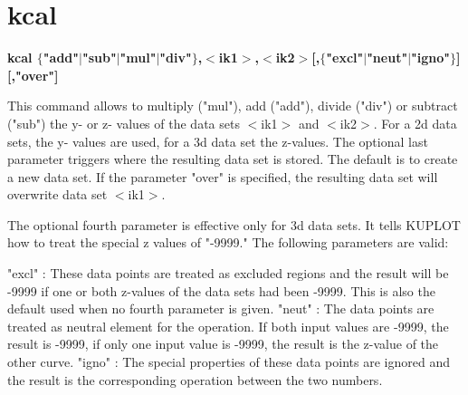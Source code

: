 \section{kcal}
{\bf kcal $ \{$"add"$| $"sub"$| $"mul"$| $"div"$\} $,$ <$ik1$> $,$ <$ik2$> $[,$ \{$"excl"$| $"neut"$| $"igno"$\} $][,"over"] \par }
\par
\vspace{3pt}
This command allows to multiply ("mul"), add ("add"), divide ("div") 
or subtract ("sub") the y- or z- values of the data sets $ <$ik1$> $ and $ <$ik2$> $. 
For a 2d data sets, the y- values are used, for a 3d data set the 
z-values.  The optional last parameter triggers where the resulting 
data set is stored. The default is to create a new data set. If the 
parameter "over" is specified, the resulting data set will overwrite 
data set $ <$ik1$> $. 
\par
The optional fourth parameter is effective only for 3d data sets. It 
tells KUPLOT how to treat the special z values of "-9999." The 
following parameters are valid: 
\par
\begin{MacVerbatim}
"excl" : These data points are treated as excluded regions and the
         result will be -9999 if one or both z-values of the data
         sets had been -9999. This is also the default used when no
         fourth parameter is given.
"neut" : The data points are treated as neutral element for the
         operation. If both input values are -9999, the result is -9999,
         if only one input value is -9999, the result is the z-value
         of the other curve.
"igno" : The special properties of these data points are ignored and
         the result is the corresponding operation between the two
         numbers.
\end{MacVerbatim}

